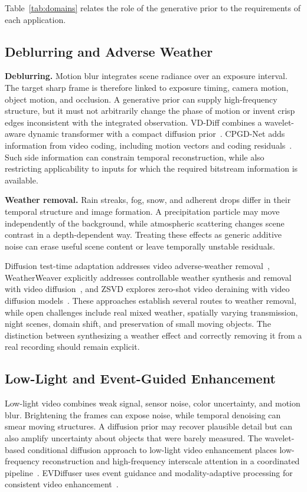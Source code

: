 Table~\ref{tab:domains} relates the role of the generative prior to the requirements of each application.

\subsection{Deblurring and Adverse Weather}
\textbf{Deblurring.} Motion blur integrates scene radiance over an exposure interval. The target sharp frame is therefore linked to exposure timing, camera motion, object motion, and occlusion. A generative prior can supply high-frequency structure, but it must not arbitrarily change the phase of motion or invent crisp edges inconsistent with the integrated observation. VD-Diff combines a wavelet-aware dynamic transformer with a compact diffusion prior~\cite{vddiff}. CPGD-Net adds information from video coding, including motion vectors and coding residuals~\cite{cpgdnet}. Such side information can constrain temporal reconstruction, while also restricting applicability to inputs for which the required bitstream information is available.

\textbf{Weather removal.} Rain streaks, fog, snow, and adherent drops differ in their temporal structure and image formation. A precipitation particle may move independently of the background, while atmospheric scattering changes scene contrast in a depth-dependent way. Treating these effects as generic additive noise can erase useful scene content or leave temporally unstable residuals.

Diffusion test-time adaptation addresses video adverse-weather removal~\cite{difftta}, WeatherWeaver explicitly addresses controllable weather synthesis and removal with video diffusion~\cite{weatherweaver}, and ZSVD explores zero-shot video deraining with video diffusion models~\cite{zsvd}. These approaches establish several routes to weather removal, while open challenges include real mixed weather, spatially varying transmission, night scenes, domain shift, and preservation of small moving objects. The distinction between synthesizing a weather effect and correctly removing it from a real recording should remain explicit.

\subsection{Low-Light and Event-Guided Enhancement}
Low-light video combines weak signal, sensor noise, color uncertainty, and motion blur. Brightening the frames can expose noise, while temporal denoising can smear moving structures. A diffusion prior may recover plausible detail but can also amplify uncertainty about objects that were barely measured. The wavelet-based conditional diffusion approach to low-light video enhancement places low-frequency reconstruction and high-frequency interscale attention in a coordinated pipeline~\cite{lowlight}. EVDiffuser uses event guidance and modality-adaptive processing for consistent video enhancement~\cite{evdiffuser}.

